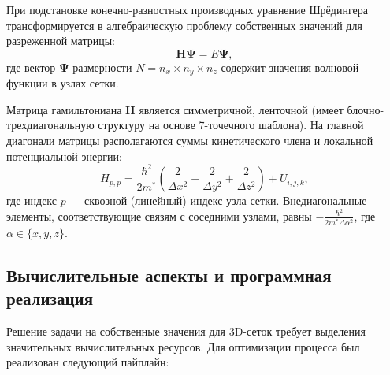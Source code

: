 \documentclass[a4paper,14pt]{extreport} %
\begin{document}
При подстановке конечно-разностных производных уравнение Шрёдингера трансформируется в алгебраическую проблему собственных значений для разреженной матрицы:
\begin{equation}
    \mathbf{H} \mathbf{\Psi} = E \mathbf{\Psi},
\end{equation}
где вектор $\mathbf{\Psi}$ размерности $N = n_x \times n_y \times n_z$ содержит значения волновой функции в узлах сетки.

Матрица гамильтониана $\mathbf{H}$ является симметричной, ленточной (имеет блочно-трехдиагональную структуру на основе 7-точечного шаблона). На главной диагонали матрицы располагаются суммы кинетического члена и локальной потенциальной энергии:
\begin{equation}
    H_{p,p} = \frac{\hbar^2}{2 m^*} \left( \frac{2}{\Delta x^2} + \frac{2}{\Delta y^2} + \frac{2}{\Delta z^2} \right) + U_{i,j,k},
\end{equation}
где индекс $p$ — сквозной (линейный) индекс узла сетки. Внедиагональные элементы, соответствующие связям с соседними узлами, равны $-\frac{\hbar^2}{2 m^* \Delta \alpha^2}$, где $\alpha \in \{x, y, z\}$.

\subsection{Вычислительные аспекты и программная реализация}
Решение задачи на собственные значения для 3D-сеток требует выделения значительных вычислительных ресурсов. Для оптимизации процесса был реализован следующий пайплайн:
\end{document}
